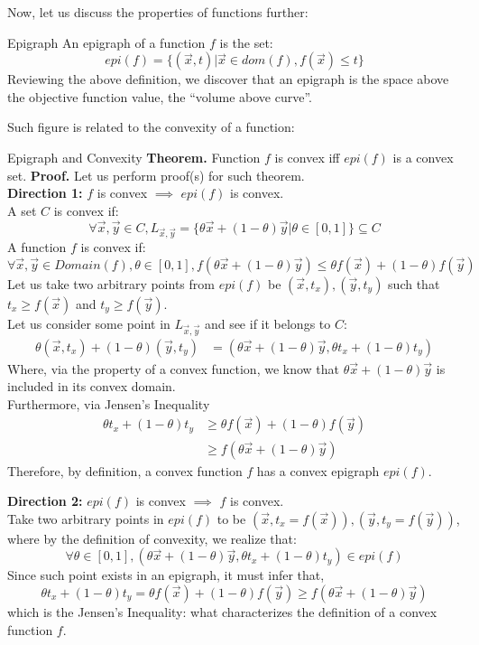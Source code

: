 Now, let us discuss the properties of functions further:
\begin{ln-define}{Epigraph}{}
    An epigraph of a function $f$ is the set:
    \[
        epi(f) = \{ (\vec{x}, t) \big| \vec{x} \in dom(f), f(\vec{x}) \leq t\}
    \]
    Reviewing the above definition, we discover that an epigraph is the space above the objective function value, the ``volume above curve''.
\end{ln-define}
Such figure is related to the convexity of a function:
\begin{ln-theorem}{Epigraph and Convexity}{}
    \textbf{Theorem.} Function $f$ is convex iff $epi(f)$ is a convex set.
    \tcblower
    \textbf{Proof.} Let us perform proof(s) for such theorem. \\
    \textbf{Direction 1:} $f$ is convex $\implies$ $epi(f)$ is convex. \\
    A set $C$ is convex if:
    \[
        \forall \vec{x}, \vec{y} \in C, L_{\vec{x}, \vec{y}} = \{\theta \vec{x} + (1 - \theta) \vec{y} | \theta \in [0, 1]\} \subseteq C
    \]
    A function $f$ is convex if:
    \[
        \forall \vec{x}, \vec{y} \in Domain(f), \theta \in [0, 1], f(\theta \vec{x} + (1 - \theta) \vec{y}) \leq \theta f(\vec{x}) + (1 - \theta) f(\vec{y})
    \]
    Let us take two arbitrary points from $epi(f)$ be $(\vec{x}, t_x), (\vec{y}, t_y)$ such that $t_x \geq f(\vec{x})$ and $t_y \geq f(\vec{y})$. \\
    Let us consider some point in $L_{\vec{x}, \vec{y}}$ and see if it belongs to $C$:
    \begin{align*}
        \theta (\vec{x}, t_x) + (1 - \theta) (\vec{y}, t_y)
        &= (\theta \vec{x} + (1 - \theta) \vec{y}, \theta t_x + (1 - \theta) t_y)
    \end{align*}
    Where, via the property of a convex function, we know that $\theta \vec{x} + (1 - \theta) \vec{y}$ is included in its convex domain. \\
    Furthermore, via Jensen's Inequality
    \begin{align*}
        \theta t_x + (1 - \theta) t_y
        &\geq \theta f(\vec{x}) + (1 - \theta) f(\vec{y}) \\
        &\geq f(\theta \vec{x} + (1 - \theta) \vec{y})
    \end{align*}
    Therefore, by definition, a convex function $f$ has a convex epigraph $epi(f)$.
    \par
    \textbf{Direction 2:} $epi(f)$ is convex $\implies$ $f$ is convex. \\
    Take two arbitrary points in $epi(f)$ to be $(\vec{x}, t_x = f(\vec{x})), (\vec{y}, t_y = f(\vec{y}))$, where by the definition of convexity, we realize that:
    \[
        \forall \theta \in [0, 1], (\theta \vec{x} + (1 - \theta) \vec{y}, \theta t_x + (1 - \theta) t_y) \in epi(f)
    \]
    Since such point exists in an epigraph, it must infer that,
    \[
        \theta t_x + (1 - \theta) t_y = \theta f(\vec{x}) + (1 - \theta) f(\vec{y}) \geq f(\theta \vec{x} + (1 - \theta) \vec{y})
    \]
    which is the Jensen's Inequality: what characterizes the definition of a convex function $f$.
\end{ln-theorem}
